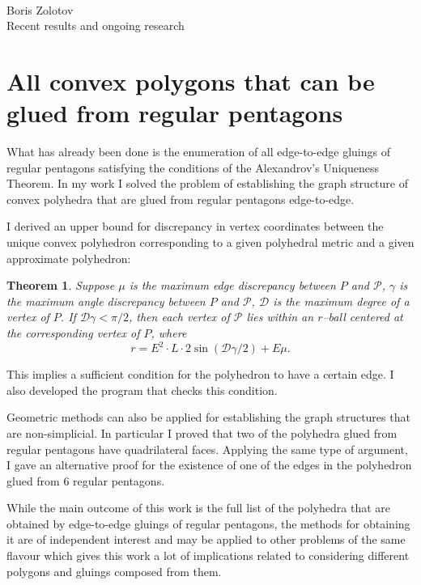 \documentclass[a4paper,11pt]{article}
\newtheorem{theorem}{Theorem}
\theoremstyle{definition}
\begin{document}
\def\P{\mathcal P} \def\Ot{\tilde O}

\begin{center} \ \\ [1.5cm]
	{\Huge Boris Zolotov} \\ [0.35cm]
	{Recent results and ongoing research}
\end{center}

\section{All convex polygons that can be glued from regular pentagons}

What has already been done is the enumeration of all edge-to-edge gluings of regular pentagons satisfying the conditions of the Alexandrov's Uniqueness Theorem. In my work I solved the problem of establishing the graph structure of convex polyhedra that are glued from regular pentagons edge-to-edge.

I derived an upper bound for discrepancy in vertex coordinates between the unique convex polyhedron corresponding to a given polyhedral metric and a given approximate polyhedron:

\begin{theorem} \label{precision}
	Suppose $\mu$ is the maximum edge discrepancy between $P$ and $\P$, $\gamma$ is the maximum angle discrepancy between $P$ and $\P$, $\mathcal D$ is the maximum degree of a vertex of $P$. If $\mathcal D \gamma < \pi / 2$, then each vertex of $\P$ lies within an $r$--ball centered at the corresponding vertex of $P$, where
\begin{equation}
	r = E^2 \cdot  L \cdot 2 \sin ( \mathcal D \gamma / 2 ) + E \mu.
\end{equation} \end{theorem}

This implies a sufficient condition for the polyhedron to have a certain edge. I also developed the program that checks this condition.

Geometric methods can also be applied for establishing the graph structures that are non-simplicial. In particular I proved that two of the polyhedra glued from regular pentagons have quadrilateral faces. Applying the same type of argument, I gave an alternative proof for the existence of one of the edges in the polyhedron glued from 6 regular pentagons.

While the main outcome of this work is the full list of the polyhedra that are obtained by edge-to-edge gluings of regular pentagons, the methods for obtaining it are of independent interest and may be applied to other problems of the same flavour which gives this work a lot of implications related to considering different polygons and gluings composed from them.
\end{document}
